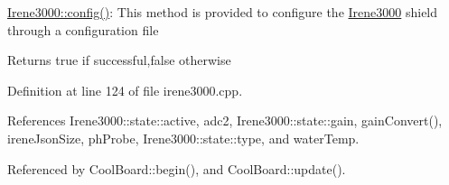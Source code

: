 \hyperlink{classIrene3000_afed5c35e4b23963c157847ef27c11e9c}{Irene3000\+::config()}\+: This method is provided to configure the \hyperlink{classIrene3000}{Irene3000} shield through a configuration file

\begin{DoxyReturn}{Returns}
true if successful,false otherwise 
\end{DoxyReturn}


Definition at line 124 of file irene3000.\+cpp.



References Irene3000\+::state\+::active, adc2, Irene3000\+::state\+::gain, gain\+Convert(), irene\+Json\+Size, ph\+Probe, Irene3000\+::state\+::type, and water\+Temp.



Referenced by Cool\+Board\+::begin(), and Cool\+Board\+::update().


